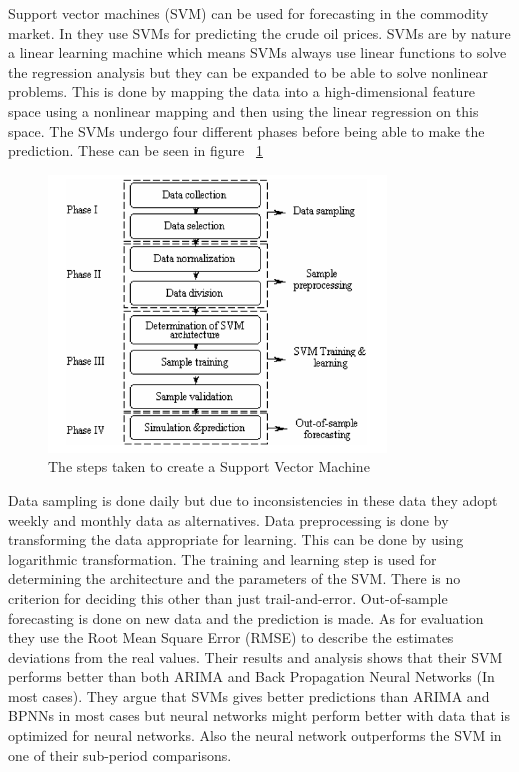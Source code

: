 Support vector machines (SVM) can be used for forecasting in the commodity market. In \cite{xie2006new} they use SVMs for predicting the crude oil prices. SVMs are by nature a linear learning machine which means SVMs always use linear functions to solve the regression analysis but they can be expanded to be able to solve nonlinear problems. This is done by mapping the data into a high-dimensional feature space using a nonlinear mapping and then using the linear regression on this space. The SVMs undergo four different phases before being able to make the prediction. These can be seen in figure ~\ref{fig:phasesOfSVM}
\begin{figure}[weight!]
\centering
\includegraphics[width=0.8\textwidth ,natwidth=410,natheight=237]{billeder/phases_of_SVM.png}
\caption{The steps taken to create a Support Vector Machine}
\label{fig:phasesOfSVM}
\end{figure}
Data sampling is done daily but due to inconsistencies in these data they adopt weekly and monthly data as alternatives. Data preprocessing is done by transforming the data appropriate for learning. This can be done by using logarithmic transformation. The training and learning step is used for determining the architecture and the parameters of the SVM. There is no criterion for deciding this other than just trail-and-error. Out-of-sample forecasting is done on new data and the prediction is made. As for evaluation they use the Root Mean Square Error (RMSE) to describe the estimates deviations from the real values. Their results and analysis shows that their SVM performs better than both ARIMA and Back Propagation Neural Networks (In most cases). They argue that SVMs gives better predictions than ARIMA and BPNNs in most cases but neural networks might perform better with data that is optimized for neural networks. Also the neural network outperforms the SVM in one of their sub-period comparisons.

